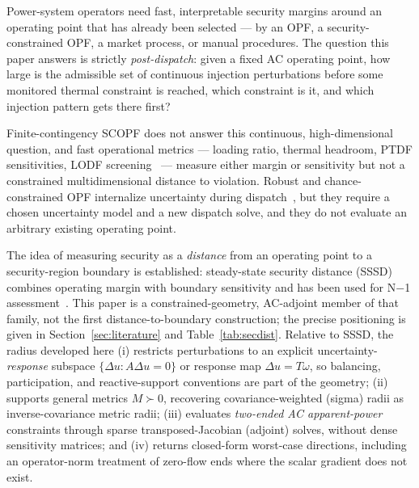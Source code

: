 \documentclass[11pt]{article}
\begin{document}
Power-system operators need fast, interpretable security margins around an
operating point that has already been selected --- by an OPF, a
security-constrained OPF, a market process, or manual procedures.  The
question this paper answers is strictly \emph{post-dispatch}: given a fixed
AC operating point, how large is the admissible set of continuous injection
perturbations before some monitored thermal constraint is reached, which
constraint is it, and which injection pattern gets there first?

Finite-contingency SCOPF does not answer this continuous, high-dimensional
question, and fast operational metrics --- loading ratio, thermal headroom,
PTDF sensitivities, LODF screening~\citep{WoodWollenbergSheble2013} ---
measure either margin or sensitivity but not a constrained multidimensional
distance to violation.  Robust and chance-constrained OPF internalize
uncertainty during dispatch~\citep{BertsimasSim2004,BenTalNemirovski1998,%
BienstockChertkovHarnett2014,RoaldEtAl2016,LubinBackhausDvorkin2016}, but
they require a chosen uncertainty model and a new dispatch solve, and they do
not evaluate an arbitrary existing operating point.

The idea of measuring security as a \emph{distance} from an operating point
to a security-region boundary is established: steady-state security distance
(SSSD) combines operating margin with boundary sensitivity and has been used
for N$-$1 assessment~\citep{ChenChenXiaKang2013,ChenChenXia2015Concept,%
ChenEtAl2015N1}.  This paper is a constrained-geometry, AC-adjoint member of
that family, not the first distance-to-boundary construction; the precise
positioning is given in Section~\ref{sec:literature} and
Table~\ref{tab:secdist}.  Relative to SSSD, the radius developed here
(i) restricts perturbations to an explicit uncertainty-\emph{response}
subspace $\{\Delta u: A\Delta u = 0\}$ or response map $\Delta u = T\omega$,
so balancing, participation, and reactive-support conventions are part of
the geometry; (ii) supports general metrics $M \succ 0$, recovering
covariance-weighted (sigma) radii as inverse-covariance metric radii;
(iii) evaluates \emph{two-ended AC apparent-power} constraints through
sparse transposed-Jacobian (adjoint) solves, without dense sensitivity
matrices; and (iv) returns closed-form worst-case directions, including an
operator-norm treatment of zero-flow ends where the scalar gradient does not
exist.
\end{document}
